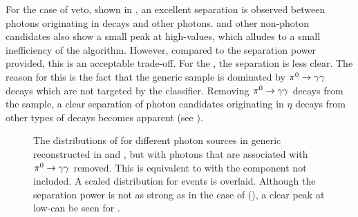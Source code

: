 For the case of \piz veto, shown in , an excellent separation is observed between photons originating in \piz decays and other photons.
\BtoXsgamma and other non-\piz photon candidates also show a small peak at high-\piVeto values, which alludes to a small inefficiency of the algorithm.
However, compared to the separation power provided, this is an acceptable trade-off.
For the \etaVeto, the separation is less clear.
The reason for this is the fact that the generic \MC sample is dominated by $\pi^0\rightarrow\gamma\gamma$ decays which are not targeted by the \etaVeto classifier.
Removing $\pi^0\rightarrow\gamma\gamma$ decays from the sample, a clear separation of photon candidates originating in $\eta$ decays from other types of decays becomes apparent (see ).

\begin{figure}[hbtp!]
    \centering
    \caption{\label{fig:vetos_nopi} The distributions of \etaVeto
    for different photon sources in generic \MC reconstructed in \feiBp and \feiBz, but with photons that are associated with $\pi^0\rightarrow\gamma\gamma$ removed.
    This is equivalent to  with the \piz component not included.
    A scaled \etaVeto distribution for \BtoXsgamma events is overlaid.
    Although the separation power is not as strong as in the case of \piVeto (), a clear peak at low-\etaVeto can be seen for \BtoXsgamma.
    }
\end{figure}


